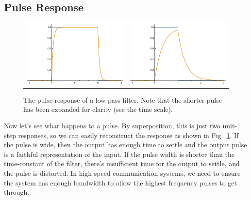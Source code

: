 \subsection{Pulse Response}
\begin{figure}[tb]
\centering
\begin{tabular}{cc}
\includegraphics[width=.4\columnwidth]{long_pulse.pdf} &
\includegraphics[width=.4\columnwidth]{fast_pulse.pdf} \\
\end{tabular}
\caption{The pulse response of a low-pass filter.  Note that the shorter pulse has been expanded for clarity (see the time scale). }
\label{fig:pulse_resp}
\end{figure}
Now let's see what happens to a pulse.  By superposition, this is just two unit-step responses, so we can easily reconstruct the response as shown in Fig.~\ref{fig:pulse_resp}.  If the pulse is wide, then the output has enough time to settle and the output pulse is a faithful representation of the input.  If the pulse width is shorter than the time-constant of the filter, there's insufficient time for the output to settle, and the pulse is distorted.  In high speed communication systems, we need to ensure the system has enough bandwidth to allow the highest frequency pulses to get through.  
